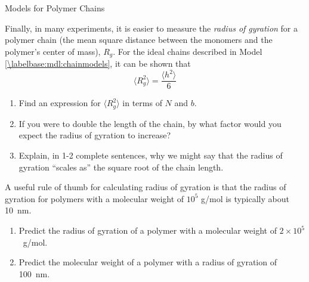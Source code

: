 \begin{activity}{Models for Polymer Chains}
\begin{ctqs}
	\question Finally, in many experiments, it is easier to measure the \emph{radius of gyration} for a polymer chain (the mean square distance between the monomers and the polymer's center of mass), $R_g$.  For the ideal chains described in Model \ref{\labelbase:mdl:chainmodels}, it can be shown that
		\begin{equation*}
			\langle R_g^2\rangle = \frac{\langle h^2\rangle}{6}
		\end{equation*}
		
		\begin{enumerate}
			\item Find an expression for $\langle R_g^2 \rangle$ in terms of $N$ and $b$.
	
		\begin{solution}[1in]
		\end{solution}
			
			\item If you were to double the length of the chain, by what factor would you expect the radius of gyration to increase?
	
		\begin{solution}[1in]
		\end{solution}
			
			\item Explain, in 1-2 complete sentences, why we might say that the radius of gyration ``scales as'' the square root of the chain length.
	
		\begin{solution}[1.5in]
		\end{solution}
		\end{enumerate}
	
\end{ctqs}

	
	
\begin{exercises}
	\exercise A useful rule of thumb for calculating radius of gyration is that the radius of gyration for polymers with a molecular weight of $10^5$ g/mol is typically about 10~nm.
	
		\begin{enumerate}
			\item Predict the radius of gyration of a polymer with a molecular weight of $2\times10^5$~g/mol.
			
			\item Predict the molecular weight of a polymer with a radius of gyration of 100~nm.
		\end{enumerate}
\end{exercises}
	
\end{activity}